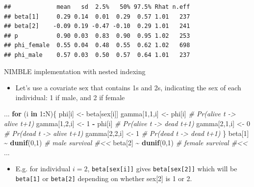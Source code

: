 \documentclass[
  12pt,
]{krantz}
\newenvironment{Shaded}{\begin{snugshade}}{\end{snugshade}}
\newcommand{\CommentTok}[1]{\textcolor[rgb]{0.56,0.35,0.01}{\textit{#1}}}
\newcommand{\ControlFlowTok}[1]{\textcolor[rgb]{0.13,0.29,0.53}{\textbf{#1}}}
\newcommand{\DecValTok}[1]{\textcolor[rgb]{0.00,0.00,0.81}{#1}}
\newcommand{\FunctionTok}[1]{\textcolor[rgb]{0.13,0.29,0.53}{\textbf{#1}}}
\newcommand{\NormalTok}[1]{#1}
\newcommand{\OtherTok}[1]{\textcolor[rgb]{0.56,0.35,0.01}{#1}}
\newcommand{\SpecialCharTok}[1]{\textcolor[rgb]{0.81,0.36,0.00}{\textbf{#1}}}
\providecommand{\tightlist}{%
  \setlength{\itemsep}{0pt}\setlength{\parskip}{0pt}}
\begin{document}
\begin{verbatim}
##             mean   sd  2.5%   50% 97.5% Rhat n.eff
## beta[1]     0.29 0.14  0.01  0.29  0.57 1.01   237
## beta[2]    -0.09 0.19 -0.47 -0.10  0.29 1.01   241
## p           0.90 0.03  0.83  0.90  0.95 1.02   253
## phi_female  0.55 0.04  0.48  0.55  0.62 1.02   698
## phi_male    0.57 0.03  0.50  0.57  0.64 1.01   237
\end{verbatim}

NIMBLE implementation with nested indexing

\begin{itemize}
\tightlist
\item
  Let's use a covariate \(\text{sex}\) that contains 1s and 2s, indicating the sex of each individual: 1 if male, and 2 if female
\end{itemize}

\begin{Shaded}
\begin{Highlighting}[]
\NormalTok{...}
\ControlFlowTok{for}\NormalTok{ (i }\ControlFlowTok{in} \DecValTok{1}\SpecialCharTok{:}\NormalTok{N)\{}
\NormalTok{  phi[i] }\OtherTok{\textless{}{-}}\NormalTok{ beta[sex[i]]}
\NormalTok{  gamma[}\DecValTok{1}\NormalTok{,}\DecValTok{1}\NormalTok{,i] }\OtherTok{\textless{}{-}}\NormalTok{ phi[i]      }\CommentTok{\# Pr(alive t {-}\textgreater{} alive t+1)}
\NormalTok{  gamma[}\DecValTok{1}\NormalTok{,}\DecValTok{2}\NormalTok{,i] }\OtherTok{\textless{}{-}} \DecValTok{1} \SpecialCharTok{{-}}\NormalTok{ phi[i]  }\CommentTok{\# Pr(alive t {-}\textgreater{} dead t+1)}
\NormalTok{  gamma[}\DecValTok{2}\NormalTok{,}\DecValTok{1}\NormalTok{,i] }\OtherTok{\textless{}{-}} \DecValTok{0}           \CommentTok{\# Pr(dead t {-}\textgreater{} alive t+1)}
\NormalTok{  gamma[}\DecValTok{2}\NormalTok{,}\DecValTok{2}\NormalTok{,i] }\OtherTok{\textless{}{-}} \DecValTok{1}           \CommentTok{\# Pr(dead t {-}\textgreater{} dead t+1)}
\NormalTok{\}}
\NormalTok{beta[}\DecValTok{1}\NormalTok{] }\SpecialCharTok{\textasciitilde{}} \FunctionTok{dunif}\NormalTok{(}\DecValTok{0}\NormalTok{,}\DecValTok{1}\NormalTok{) }\CommentTok{\# male survival \#\textless{}\textless{}}
\NormalTok{beta[}\DecValTok{2}\NormalTok{] }\SpecialCharTok{\textasciitilde{}} \FunctionTok{dunif}\NormalTok{(}\DecValTok{0}\NormalTok{,}\DecValTok{1}\NormalTok{) }\CommentTok{\# female survival \#\textless{}\textless{}}
\NormalTok{...}
\end{Highlighting}
\end{Shaded}

\begin{itemize}
\tightlist
\item
  E.g. for individual \(i = 2\), \texttt{beta{[}sex{[}i{]}{]}} gives \texttt{beta{[}sex{[}2{]}{]}} which will be \texttt{beta{[}1{]}} or \texttt{beta{[}2{]}} depending on whether sex{[}2{]} is 1 or 2.
\end{itemize}
\end{document}
